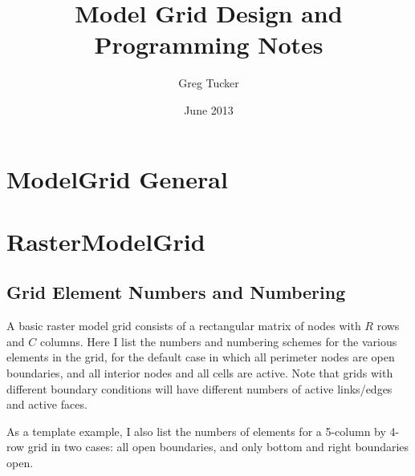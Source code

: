 \documentclass[12pt]{amsart}
\title{Model Grid Design and Programming Notes}
\author{Greg Tucker}
\date{June 2013} %
\begin{document}
\maketitle

\section{ModelGrid General}



\section{RasterModelGrid}

\subsection{Grid Element Numbers and Numbering}

A basic raster model grid consists of a rectangular matrix of nodes with $R$ rows and $C$ columns. Here I list the numbers and numbering schemes for the various elements in the grid, for the default case in which all perimeter nodes are open boundaries, and all interior nodes and all cells are active. Note that grids with different boundary conditions will have different numbers of active links/edges and active faces. 

As a template example, I also list the numbers of elements for a 5-column by 4-row grid in two cases: all open boundaries, and only bottom and right boundaries open.
\end{document}
